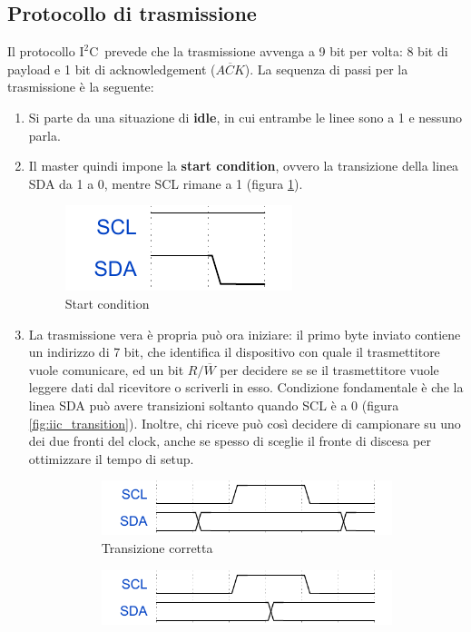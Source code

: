 \documentclass[11pt,4paper]{report}
\newcommand{\iic}{$\text{I}^2\text{C}$}
\begin{document}
\subsection{Protocollo di trasmissione}
Il protocollo \iic\ prevede che la trasmissione avvenga a 9 bit per volta: 8 bit di payload e 1 bit di acknowledgement ($\overline{ACK}$). La sequenza di passi per la trasmissione è la seguente:
\begin{enumerate}
	\item Si parte da una situazione di \textbf{idle}, in cui entrambe le linee sono a 1 e nessuno parla.
	\item Il master quindi impone la \textbf{start condition}, ovvero la transizione della linea SDA da 1 a 0, mentre SCL rimane a 1 (figura \ref{fig:iic_start}).
	\begin{figure}[H]
		\centering
		\includegraphics[width=0.3\linewidth]{seriali/start_condition}
		\caption{Start condition}
		\label{fig:iic_start}
	\end{figure}
	\item La trasmissione vera è propria può ora iniziare: il primo byte inviato contiene un indirizzo di 7 bit, che identifica il dispositivo con quale il trasmettitore vuole comunicare, ed un bit $R/\overline{W}$ per decidere se se il trasmettitore vuole leggere dati dal ricevitore o scriverli in esso. Condizione fondamentale è che la linea SDA può avere transizioni soltanto quando SCL è a 0 (figura \ref{fig:iic_transition}). Inoltre, chi riceve può così decidere di campionare su uno dei due fronti del clock, anche se spesso di sceglie il fronte di discesa per ottimizzare il tempo di setup.
	\begin{figure}[H]
		\begin{subfigure}{.5\textwidth}
			\centering
			\includegraphics[width=\linewidth]{seriali/iic_correct}
			\caption{Transizione corretta}
		\end{subfigure}
		\begin{subfigure}{.5\textwidth}
			\centering
			\includegraphics[width=\linewidth]{seriali/iic_error}

\end{subfigure}
\end{figure}
\end{enumerate}
\end{document}
